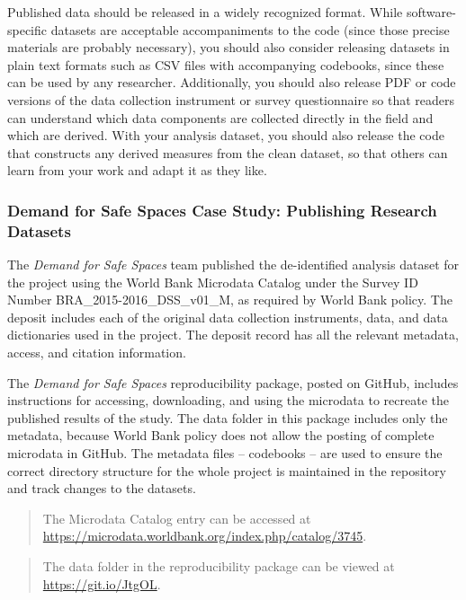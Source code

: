 \documentclass[
]{book}
\begin{document}
Published data should be released in a widely recognized format.
While software-specific datasets are acceptable accompaniments to the code
(since those precise materials are probably necessary),
you should also consider releasing datasets in plain text formats
such as CSV files with accompanying codebooks,
since these can be used by any researcher.
Additionally, you should also release PDF or code versions of
the data collection instrument or survey questionnaire
so that readers can understand which data components are
collected directly in the field and which are derived.
With your analysis dataset,
you should also release the code
that constructs any derived measures
from the clean dataset,
so that others can learn from your work and adapt it as they like.

\begin{ex}
\hypertarget{demand-for-safe-spaces-case-study-publishing-research-datasets}{%
\subsubsection{Demand for Safe Spaces Case Study: Publishing Research
Datasets}\label{demand-for-safe-spaces-case-study-publishing-research-datasets}}

The \emph{Demand for Safe Spaces} team published the de-identified
analysis dataset for the project using the World Bank Microdata Catalog
under the Survey ID Number BRA\_2015-2016\_DSS\_v01\_M, as required by
World Bank policy. The deposit includes each of the original data
collection instruments, data, and data dictionaries used in the project.
The deposit record has all the relevant metadata, access, and citation
information.

The \emph{Demand for Safe Spaces} reproducibility package, posted on
GitHub, includes instructions for accessing, downloading, and using the
microdata to recreate the published results of the study. The data
folder in this package includes only the metadata, because World Bank
policy does not allow the posting of complete microdata in GitHub. The
metadata files -- codebooks -- are used to ensure the correct directory
structure for the whole project is maintained in the repository and
track changes to the datasets.

\begin{quote}
The Microdata Catalog entry can be accessed at
\url{https://microdata.worldbank.org/index.php/catalog/3745}.
\end{quote}

\begin{quote}
The data folder in the reproducibility package can be viewed at
\url{https://git.io/JtgOL}.
\end{quote}
\end{ex}
\end{document}
